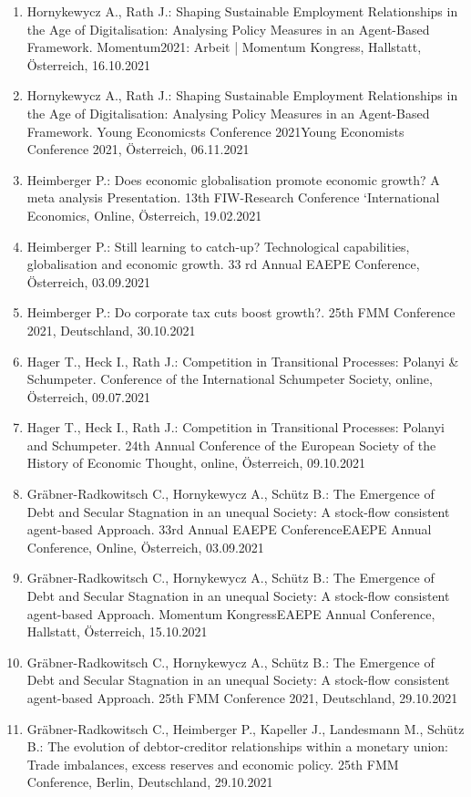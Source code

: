 \begin{enumerate}
	\item Hornykewycz A., Rath J.: Shaping Sustainable Employment Relationships in the Age of Digitalisation: Analysing Policy Measures in an Agent-Based Framework. Momentum2021: Arbeit | Momentum Kongress, Hallstatt, Österreich, 16.10.2021
	\item Hornykewycz A., Rath J.: Shaping Sustainable Employment Relationships in the Age of Digitalisation: Analysing Policy Measures in an Agent-Based Framework. Young Economicsts Conference 2021Young Economists Conference 2021, Österreich, 06.11.2021
	\item Heimberger P.: Does economic globalisation promote economic growth? A meta analysis Presentation. 13th FIW-Research Conference ‘International Economics, Online, Österreich, 19.02.2021
	\item Heimberger P.: Still learning to catch-up? Technological capabilities, globalisation and economic growth. 33 rd Annual EAEPE Conference, Österreich, 03.09.2021
	\item Heimberger P.: Do corporate tax cuts boost growth?. 25th FMM Conference 2021, Deutschland, 30.10.2021
	\item Hager T., Heck I., Rath J.: Competition in Transitional Processes: Polanyi \& Schumpeter. Conference of the International Schumpeter Society, online, Österreich, 09.07.2021
	\item Hager T., Heck I., Rath J.: Competition in Transitional Processes: Polanyi and Schumpeter. 24th Annual Conference of the European Society of the History of Economic Thought, online, Österreich, 09.10.2021
	\item Gräbner-Radkowitsch C., Hornykewycz A., Schütz B.: The Emergence of Debt and Secular Stagnation in an unequal Society: A stock-flow consistent agent-based Approach. 33rd Annual EAEPE ConferenceEAEPE Annual Conference, Online, Österreich, 03.09.2021
	\item Gräbner-Radkowitsch C., Hornykewycz A., Schütz B.: The Emergence of Debt and Secular Stagnation in an unequal Society: A stock-flow consistent agent-based Approach. Momentum KongressEAEPE Annual Conference, Hallstatt, Österreich, 15.10.2021
	\item Gräbner-Radkowitsch C., Hornykewycz A., Schütz B.: The Emergence of Debt and Secular Stagnation in an unequal Society: A stock-flow consistent agent-based Approach. 25th FMM Conference 2021, Deutschland, 29.10.2021
	\item Gräbner-Radkowitsch C., Heimberger P., Kapeller J., Landesmann M., Schütz B.: The evolution of debtor-creditor relationships within a monetary union:  Trade imbalances, excess reserves and economic policy. 25th FMM Conference, Berlin, Deutschland, 29.10.2021

\end{enumerate}
